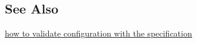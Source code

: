 \subsection*{See Also}


\begin{DoxyItemize}
\item \hyperlink{md_doc_tutorials_validation_doc_tutorials_validation_md}{how to validate configuration with the specification} 
\end{DoxyItemize}